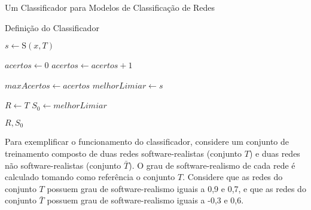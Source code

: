 \begin{section}{Um Classificador para Modelos de Classificação de Redes}
\begin{subsection}{Definição do Classificador}
\begin{algorithm}
\begin{algorithmic}
	\STATE $s \gets \mathrm{S}(x, T)$
	
	\STATE $acertos \gets 0$
			\STATE $acertos \gets acertos + 1$
		\ENDIF
	\ENDFOR
	
		\STATE $maxAcertos \gets acertos$
		\STATE $melhorLimiar \gets s$
	\ENDIF
\ENDFOR

\STATE $R \gets T$
\STATE $S_0 \gets melhorLimiar$

\RETURN $R, S_0$
\end{algorithmic}	
\end{algorithm}

	 
	
Para exemplificar o funcionamento do classificador, considere um conjunto de treinamento composto de duas redes software-realistas (conjunto $T$) e duas redes não software-realistas (conjunto $\bar{T}$). O grau de software-realismo de cada rede é calculado tomando como referência o conjunto $T$. Considere que as redes do conjunto $T$ possuem grau de software-realismo iguais a 0,9 e 0,7, e que as redes do conjunto $\bar{T}$ possuem grau de software-realismo iguais a -0,3 e 0,6.


\end{subsection}
\end{section}
